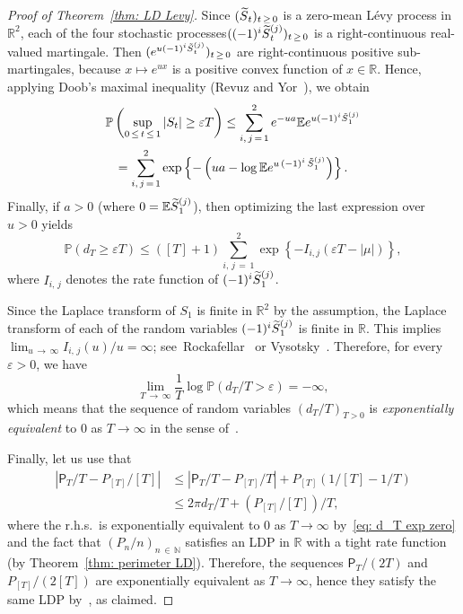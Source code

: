 \documentclass[10pt]{amsart}
\theoremstyle{definition}\newtheorem{defi}[theo]{Definition}\newtheorem{rema}[theo]{Remark}\newtheorem{exam}[theo]{Example}\newtheorem{exem}[theo]{Example}\newtheorem{nota}[theo]{Notation}
\newcommand{\Rbb}{\mathbb{R}}
\newcommand{\N}{\mathbb{N}}
\newcommand{\E}{\mathbb{E}}
\newcommand{\Pbb}{\mathbb{P}}
\newcommand{\sfP}{\mathsf{P}}
\let\oldtilde\tilde
\renewcommand*{\tilde}[1]{\mathchoice{\widetilde{#1}}{\widetilde{#1}}{\oldtilde{#1}}{\oldtilde{#1}}}
\begin{document}
\begin{proof}[Proof of Theorem~\ref{thm: LD Levy}]
Since $(\tilde S_t)_{t\,\ge\,0}$ is a zero-mean L\'evy process in $\Rbb^2$, each of the four stochastic proce\-sses$((-1)^i \tilde S_t^{(j)})_{t\,\ge\,0}$ is a right-continuous real-valued martingale. Then $ (e^{u (-1)^i \tilde S_t^{(j)}})_{t \,\ge\,0}$ are right-continuous positive sub-martingales, because $x \mapsto e^{u x}$ is a positive convex function of $ x \in \Rbb$. Hence, applying Doob's maximal inequality (Revuz and Yor~\cite[Theorem~1.7, Chapter~II]{RevuzYor}), we obtain
\begin{multline*}
\Pbb \left(\sup_{0\,\le\,t\,\le\,1} |S_t | \ge \varepsilon T \right) \le \sum_{i,\,j\,=\,1}^2 e^{-ua } \E e^{u (-1)^i \tilde S_1^{(j)}}\\
= \sum_{i,\,j\,=\,1}^2 \exp \left\{- \left(ua - \log \E e^{u\,(-1)^i\,\tilde S_1^{(j)}} \right) \right\}.
\end{multline*}
Finally, if $a>0$ (where $0=\E \tilde S_1^{(j)} $), then optimizing the last expression over $u >0$ yields
\[
\Pbb \left(d_T \ge \varepsilon T \right) \le ([T] +1) \sum_{i,\, j\,=\,1}^2 \exp \left\{- I_{i, j} \left(\varepsilon T - |\mu| \right) \right\},
\]
where $I_{i,\,j}$ denotes the rate function of $(-1)^i \tilde S_1^{(j)}$.

Since the Laplace transform of $S_1$ is finite in $\Rbb^2$ by the assumption, the Laplace transform of each of the random variables $(-1)^i \tilde S_1^{(j)}$ is finite in $\Rbb$. This implies $\lim_{u\,\to\,\infty} I_{i,\,j}(u)/u = \infty$; see~Rockafellar~\cite[Theorems~8.5 and 13.3]{Rockafellar} or Vysotsky~\cite[Eqs.~(5.4) and~(5.5)]{VysotskyNote}. Therefore, for every $\varepsilon >0$, we have
\begin{equation}\label{eq: d_T exp zero}
\lim_{T\,\to\,\infty} \frac{1}{T} \log \Pbb \left(d_T/T> \varepsilon \right) = -\infty,
\end{equation}
which means that the sequence of random variables $(d_T/T)_{T >0} $ is \emph{exponentially equivalent} to $0$ as $T \to \infty$ in the sense of~\cite[Definition~4.2.10]{DemboZeitouni}.

Finally, let us use that
\begin{align*}
\left|\sfP_T/T - P_{[T]}/[T] \right| &\le \left|\sfP_T/T - P_{[T]}/T \right| + P_{[T]}\left(1/[T]-1/T\right)\\
&\le 2 \pi d_T/T + \left(P_{[T]}/[T]\right)/T,
\end{align*}
where the r.h.s.\ is exponentially equivalent to $0$ as $T \to \infty$ by~\eqref{eq: d_T exp zero} and the fact that $ (P_n/n)_{n\,\in\,\N} $ satisfies an LDP in $\Rbb$ with a tight rate function (by Theorem~\ref{thm: perimeter LD}). Therefore, the sequences $\sfP_T/(2T) $ and $ P_{[T]}/(2[T]) $ are exponentially equivalent as $T \to \infty$, hence they satisfy the same LDP by~\cite[Theorem~4.2.13]{DemboZeitouni}, as claimed.


\end{proof}
\end{document}
